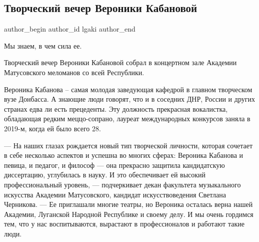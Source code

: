  
 
 
 
 
 
\subsection{Творческий вечер Вероники Кабановой}
\label{sec:15_12_2021.fb.lgaki.1.tvorcheskij_vecher_veronika_kabanova}
 
\ifcmt
 author_begin
   author_id lgaki
 author_end
\fi

Мы знаем, в чем сила ее.

Творческий вечер Вероники Кабановой собрал в концертном зале Академии
Матусовского меломанов со всей Республики.

Вероника Кабанова – самая молодая заведующая кафедрой в главном творческом вузе
Донбасса. А знающие люди говорят, что и в соседних ДНР, России и других странах
едва ли есть прецеденты. Эту должность прекрасная вокалистка, обладающая редким
меццо-сопрано, лауреат международных конкурсов заняла в 2019-м, когда ей было
всего 28.


— На наших глазах рождается новый тип творческой личности, которая сочетает в
себе несколько аспектов и успешна во многих сферах: Вероника Кабанова и певица,
и педагог, и философ — она прекрасно защитила кандидатскую диссертацию,
углубилась в науку. И это обеспечивает ей высокий профессиональный уровень, —
подчеркивает декан факультета музыкального искусства Академии Матусовского,
кандидат искусствоведения Светлана Черникова. — Ее приглашали многие театры, но
Вероника осталась верна нашей Академии, Луганской Народной Республике и своему
делу. И мы очень гордимся тем, что у нас воспитываются, вырастают в
профессионалов и работают такие люди.


